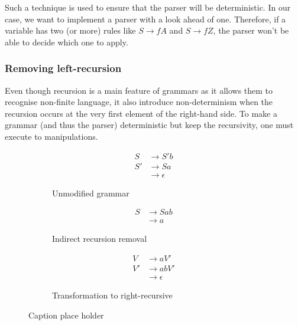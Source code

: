 \documentclass[a4paper,11pt]{article}
\begin{document}
      Such a technique is used to ensure that the parser will be deterministic. In our case, we want to implement a parser with a look ahead of one. Therefore, if a variable has two (or more) rules like $S \rightarrow fA$ and $S \rightarrow fZ$, the parser won't be able to decide which one to apply.
      
      \subsubsection{Removing left-recursion}
        Even though recursion is a main feature of grammars as it allows them to recognise non-finite language, it also introduce non-determinism when the recursion occurs at the very first element of the right-hand side. To make a grammar (and thus the parser) deterministic but keep the recursivity, one must execute to manipulations.
        \begin{figure}[h!]
          \centering
          \begin{subfigure}[b]{0.33\textwidth}
              \centering
              \begin{align}
                S  &\rightarrow S'b \\
                S' &\rightarrow Sa \\
                   &\rightarrow \epsilon
              \end{align}
              \caption{Unmodified grammar}
              \label{fig:unmodifiedgrammar2}
          \end{subfigure}%
          \begin{subfigure}[b]{0.33\textwidth}
              \centering
              \begin{align}
                S  &\rightarrow Sab \\
                   &\rightarrow a
              \end{align}
              \caption{Indirect recursion removal}
              \label{fig:indirectremovalgrammar2}
          \end{subfigure}
          \begin{subfigure}[b]{0.33\textwidth}
              \centering
              \begin{align}
                V  &\rightarrow aV' \\
                V' &\rightarrow abV' \\
                   &\rightarrow \epsilon
              \end{align}
              \caption{Transformation to right-recursive}
              \label{fig:rightrecursivegrammar2}
          \end{subfigure}
          \caption{Caption place holder}
      \end{figure}\\
\end{document}
